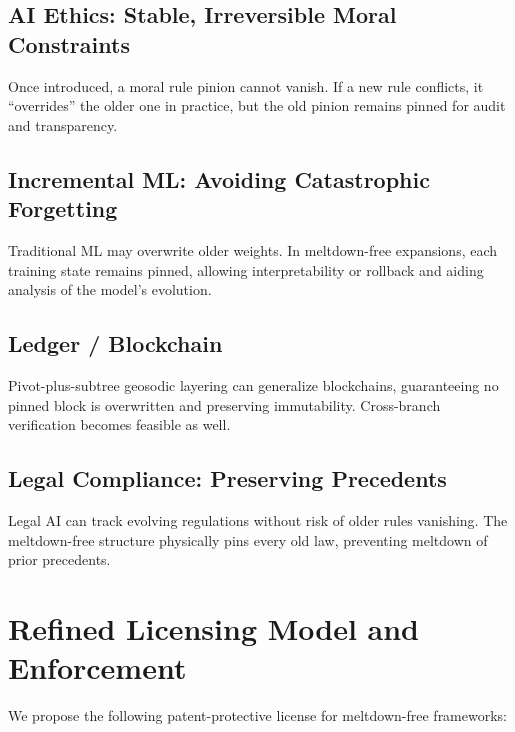 \documentclass[acmsmall]{acmart}
\theoremstyle{definition}
\theoremstyle{remark}
\begin{document}
\subsection{AI Ethics: Stable, Irreversible Moral Constraints}
Once introduced, a moral rule pinion cannot vanish. If a new rule conflicts,
it “overrides” the older one in practice, but the old pinion remains pinned for
audit and transparency.

\subsection{Incremental ML: Avoiding Catastrophic Forgetting}
Traditional ML may overwrite older weights. In meltdown-free expansions, each training
state remains pinned, allowing interpretability or rollback and aiding analysis
of the model’s evolution.

\subsection{Ledger / Blockchain}
Pivot-plus-subtree geosodic layering can generalize blockchains, guaranteeing no
pinned block is overwritten and preserving immutability. Cross-branch verification
becomes feasible as well.

\subsection{Legal Compliance: Preserving Precedents}
Legal AI can track evolving regulations without risk of older rules vanishing.
The meltdown-free structure physically pins every old law, preventing meltdown
of prior precedents.

\section{Refined Licensing Model and Enforcement}
\label{sec:licensing}

We propose the following patent-protective license for meltdown-free frameworks:
\end{document}
